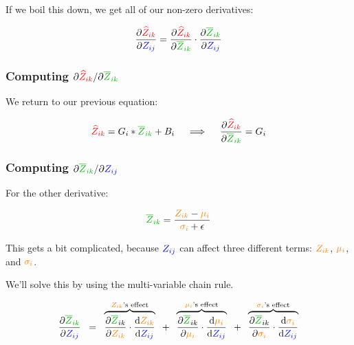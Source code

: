             If we boil this down, we get all of our non-zero derivatives:

            \begin{equation}
                \pderiv{ \red{\widehat{Z}_{ik}} }{ \blu{Z_{ij}} } = 
                \pderiv{ \red{\widehat{Z}_{ik}} }{ \grn{\overline{Z}_{ik} } } \cdot 
                \pderiv{ \grn{\overline{Z}_{ik}} }{ \blu{Z_{ij}} }
            \end{equation}

        \subsubsection{Computing $\pderivslash{ \red{\widehat{Z}_{ik}} }{ \grn{\overline{Z}_{ik} } }$}

            We return to our previous equation:

            \begin{equation}
                \red{\widehat{Z}_{ik}} = G_i * \grn{\overline{Z}_{ik}} + B_i
                \quad \implies \quad
                \pderiv{ \red{\widehat{Z}_{ik}} }{ \grn{\overline{Z}_{ik} } } = G_i
            \end{equation}

        \subsubsection{Computing $\pderivslash{\grn{\overline{Z}_{ik}}}{\blu{Z_{ij}}}$}

            For the other derivative:

            \begin{equation}
                \grn{\overline{Z}_{ik}}  =  \frac{ \org{Z_{ik} }  - \org{\mu_i}}{\org{\sigma_i}+\epsilon}
            \end{equation}

            This gets a bit complicated, because $\textcolor{blue}{Z_{ij}}$ can affect three different terms: $\textcolor{orange}{Z_{ik}}$, $\textcolor{orange}{\mu_i}$, and $\textcolor{orange}{\sigma_i}$. 

            We'll solve this by using the multi-variable chain rule.

            \begin{equation}
                \pderiv{\grn{\overline{Z}_{ik}}}{\blu{Z_{ij}}} 
                \;\;=\;\;
                \overbrace{
                    \pderiv{\grn{\overline{Z}}_{ik}}{\org{Z_{ik}}} \cdot 
                    \deriv{\org{Z_{ik}}}{\blu{Z_{ij}}}
                }^{\text{$\org{Z_{ik}}$'s effect}}
                \;\;+\;\;
                \overbrace{
                    \pderiv{\grn{\overline{Z}}_{ik}}{\org{\mu_i}} \cdot 
                    \deriv{\org{\mu_i}}{\blu{Z_{ij}}}
                }^{\text{$\org{\mu_i}$'s effect}}
                \;\;+\;\;
                \overbrace{
                    \pderiv{\grn{\overline{Z}}_{ik}}{\org{\sigma_i}} \cdot 
                    \deriv{\org{\sigma_i}}{\blu{Z_{ij}}}
                }^{\text{$\org{\sigma_i}$'s effect}}
            \end{equation}

